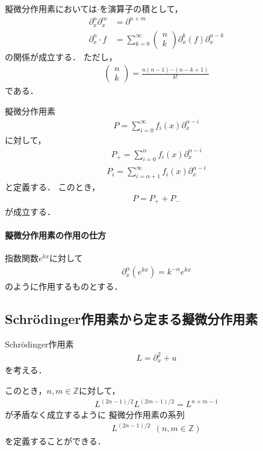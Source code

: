 \documentclass[dvipdfmx,12pt,a4paper,uplatex]{jsarticle}
\theoremstyle{plain}
\theoremstyle{definition}
\begin{document}
擬微分作用素においては$\cdot$を演算子の積として，
\begin{align}
\partial_x^n \partial_x^m 
&= \partial^{n+m}  \\
\partial_x^{n} \cdot f  
&=
\sum_{k=0}^\infty 
\begin{pmatrix} n \\ k \end{pmatrix}
\partial_x^k(f) \partial_x^{n-k}
\end{align}
の関係が成立する．
ただし，
\begin{align}
\begin{pmatrix} n \\ k \end{pmatrix} 
=
\frac{n(n-1)\cdots (n-k+1)}{k!}
\end{align}
である．

擬微分作用素
\begin{align}
P =
\sum_{i=0}^{\infty} f_i(x) \partial_x^{\alpha-i}
\end{align}
に対して，
\begin{align}
P_+ =
\sum_{i=0}^{\alpha} f_i(x) \partial_x^{\alpha-i}
\end{align}
\begin{align}
P_i =
\sum_{i=\alpha+1}^{\infty} f_i(x) \partial_x^{\alpha-i}
\end{align}
と定義する．
このとき，
\begin{align}
P = P_+ + P_-
\end{align}
が成立する．

\paragraph{擬微分作用素の作用の仕方\\}
指数関数$e^{kx}$に対して
\begin{align}
\partial_x^{\alpha} (e^{kx}) = k^{-\alpha} e^{kx}
\end{align}
のように作用するものとする．

\subsection{Schr\"odinger作用素から定まる擬微分作用素}
Schr\"odinger作用素
\begin{align}
L = \partial^2_x + u
\end{align}
を考える．

このとき，$n,m\in\mathbb{Z}$に対して，
\begin{align}
L^{(2n-1)/2} L^{(2m-1)/2} = L^{n+m-1}
\end{align}
が矛盾なく成立するように
擬微分作用素の系列
\begin{align}
L^{(2n-1)/2} \ \ (n,m\in\mathbb{Z})
\end{align}
を定義することができる．
\end{document}
